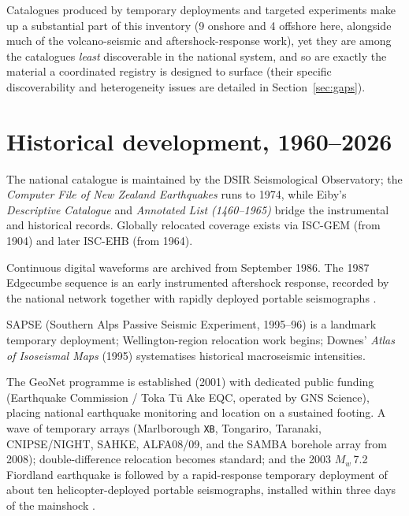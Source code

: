 \documentclass[10pt,a4paper]{article}
\begin{document}
Catalogues produced by temporary deployments and targeted experiments make up a substantial part of this inventory (9 onshore and 4 offshore here, alongside much of the volcano-seismic and aftershock-response work), yet they are among the catalogues \emph{least} discoverable in the national system, and so are exactly the material a coordinated registry is designed to surface (their specific discoverability and heterogeneity issues are detailed in Section~\ref{sec:gaps}).
\section{Historical development, 1960--2026}\label{sec:timeline}
\begin{description}[leftmargin=0pt,style=unboxed,itemsep=3pt]
\item[1960s--1970s (analogue era).] The national catalogue is maintained by the DSIR Seismological Observatory; the \emph{Computer File of New Zealand Earthquakes} runs to 1974, while Eiby's \emph{Descriptive Catalogue} and \emph{Annotated List (1460--1965)} bridge the instrumental and historical records. Globally relocated coverage exists via ISC-GEM (from 1904) and later ISC-EHB (from 1964).
\item[1980s (digitisation).] Continuous digital waveforms are archived from September 1986. The 1987 Edgecumbe sequence is an early instrumented aftershock response, recorded by the national network together with rapidly deployed portable seismographs \cite{Smith1989}.
\item[1990s (first large passive experiments).] SAPSE (Southern Alps Passive Seismic Experiment, 1995--96) is a landmark temporary deployment; Wellington-region relocation work begins; Downes' \emph{Atlas of Isoseismal Maps} (1995) systematises historical macroseismic intensities.
\item[2000s (GeoNet established; targeted arrays and double-difference relocation).] The GeoNet programme is established (2001) with dedicated public funding (Earthquake Commission / Toka T\=u Ake EQC, operated by GNS Science), placing national earthquake monitoring and location on a sustained footing. A wave of temporary arrays (Marlborough \texttt{XB}, Tongariro, Taranaki, CNIPSE/NIGHT, SAHKE, ALFA08/09, and the SAMBA borehole array from 2008); double-difference relocation becomes standard; and the 2003 $M_w$\,7.2 Fiordland earthquake is followed by a rapid-response temporary deployment of about ten helicopter-deployed portable seismographs, installed within three days of the mainshock \cite{McGinty2007}.

\end{description}
\end{document}
